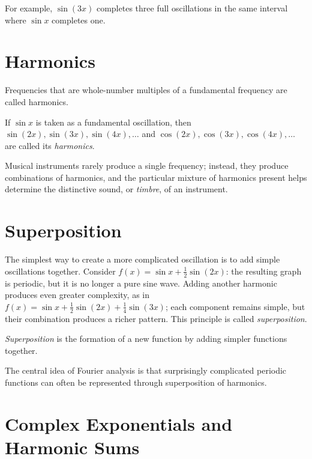 For example, $\sin(3x)$ completes three full oscillations in the same
interval where $\sin x$ completes one.

\section{Harmonics}

Frequencies that are whole-number multiples of a fundamental frequency
are called harmonics.

\begin{definition}
If $\sin x$ is taken as a fundamental oscillation, then $\sin(2x),
\sin(3x), \sin(4x), \dots$ and $\cos(2x), \cos(3x), \cos(4x), \dots$ are
called its \emph{harmonics}.
\end{definition}

Musical instruments rarely produce a single frequency; instead, they
produce combinations of harmonics, and the particular mixture of
harmonics present helps determine the distinctive sound, or
\emph{timbre}, of an instrument.

\section{Superposition}

The simplest way to create a more complicated oscillation is to add
simple oscillations together. Consider $f(x) = \sin x + \tfrac12\sin(2x)$:
the resulting graph is periodic, but it is no longer a pure sine wave.
Adding another harmonic produces even greater complexity, as in $f(x) =
\sin x + \tfrac12\sin(2x) + \tfrac14\sin(3x)$; each component remains
simple, but their combination produces a richer pattern. This principle
is called \emph{superposition}.

\begin{definition}
\emph{Superposition} is the formation of a new function by adding
simpler functions together.
\end{definition}

The central idea of Fourier analysis is that surprisingly complicated
periodic functions can often be represented through superposition of
harmonics.

\section{Complex Exponentials and Harmonic Sums}

